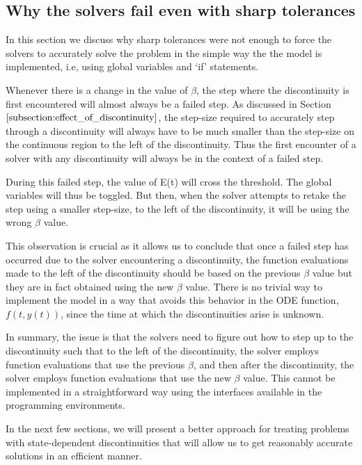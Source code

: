 \subsection{Why the solvers fail even with sharp tolerances}
\label{subsection:state_sharp_tol_failed}
In this section we discuss why sharp tolerances were not enough to force the solvers to accurately solve the problem in the simple way the the model is implemented, i.e, using global variables and `if' statements. 

Whenever there is a change in the value of $\beta$, the step where the discontinuity is first encountered will almost always be a failed step. As discussed in Section $\ref{subsection:effect_of_discontinuity}$, the step-size required to accurately step through a discontinuity will always have to be much smaller than the step-size on the continuous region to the left of the discontinuity. Thus the first encounter of a solver with any discontinuity will always be in the context of a failed step.

During this failed step, the value of E(t) will cross the threshold. The global variables will thus be toggled. But then, when the solver attempts to retake the step using a smaller step-size, to the left of the discontinuity, it will be using the wrong $\beta$ value. 

This observation is crucial as it allows us to conclude that once a failed step has occurred due to the solver encountering a discontinuity, the function evaluations made to the left of the discontinuity should be based on the previous $\beta$ value but they are in fact obtained using the new $\beta$ value. There is no trivial way to implement the model in a way that avoids this behavior in the ODE function, $f(t, y(t))$, since the time at which the discontinuities arise is unknown. 

In summary, the issue  is that the solvers need to figure out how to step up to the discontinuity such that to the left of the discontinuity, the solver employs function evaluations that use the previous $\beta$, and then after the discontinuity, the solver employs function evaluations that use the new $\beta$ value. This cannot be implemented in a straightforward way using the interfaces available in the programming environments.

In the next few sections, we will present a better approach for treating problems with state-dependent discontinuities that will allow us to get reasonably accurate solutions in an efficient manner.

